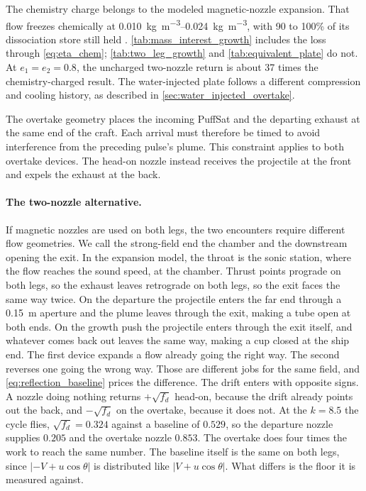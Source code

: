 \documentclass{article}
\begin{document}
The chemistry charge belongs to the modeled magnetic-nozzle expansion. That flow freezes chemically at \SIrange{0.010}{0.024}{\kilogram\per\cubic\meter}, with 90 to 100\% of its dissociation store still held \cite{Katz_puffsat_impact_sim_2026}. \autoref{tab:mass_interest_growth} includes the loss through \autoref{eq:eta_chem}; \autoref{tab:two_leg_growth} and \autoref{tab:equivalent_plate} do not. At $e_1=e_2=0.8$, the uncharged two-nozzle return is about 37 times the chemistry-charged result. The water-injected plate follows a different compression and cooling history, as described in \autoref{sec:water_injected_overtake}.

The overtake geometry places the incoming PuffSat and the departing exhaust at the same end of the craft. Each arrival must therefore be timed to avoid interference from the preceding pulse's plume. This constraint applies to both overtake devices. The head-on nozzle instead receives the projectile at the front and expels the exhaust at the back.

\paragraph{The two-nozzle alternative.} If magnetic nozzles are used on both legs, the two encounters require different flow geometries. We call the strong-field end the chamber and the downstream opening the exit. In the expansion model, the throat is the sonic station, where the flow reaches the sound speed, at the chamber. Thrust points prograde on both legs, so the exhaust leaves retrograde on both legs, so the exit faces the same way twice. On the departure the projectile enters the far end through a \SI{0.15}{\meter} aperture and the plume leaves through the exit, making a tube open at both ends. On the growth push the projectile enters through the exit itself, and whatever comes back out leaves the same way, making a cup closed at the ship end. The first device expands a flow already going the right way. The second reverses one going the wrong way. Those are different jobs for the same field, and \autoref{eq:reflection_baseline} prices the difference. The drift enters with opposite signs. A nozzle doing nothing returns $+\sqrt{f_d}$ head-on, because the drift already points out the back, and $-\sqrt{f_d}$ on the overtake, because it does not. At the $k = 8.5$ the cycle flies, $\sqrt{f_d} = 0.324$ against a baseline of $0.529$, so the departure nozzle supplies $0.205$ and the overtake nozzle $0.853$. The overtake does four times the work to reach the same number. The baseline itself is the same on both legs, since $|{-V} + u\cos\theta|$ is distributed like $|V + u\cos\theta|$. What differs is the floor it is measured against.
\end{document}

